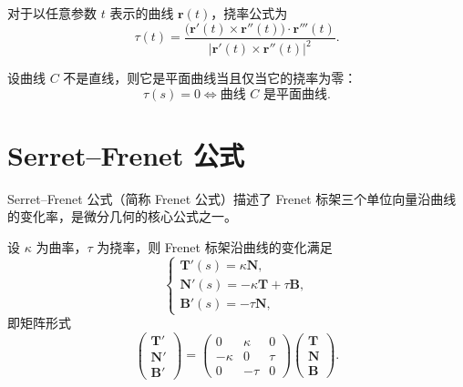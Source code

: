 \begin{proposition}[任意参数下的挠率公式]
	对于以任意参数 $t$ 表示的曲线 $\boldsymbol{r}(t)$，挠率公式为
	\begin{equation}
		\tau(t)=\frac{\bigl(\boldsymbol{r}'(t)\times\boldsymbol{r}''(t)\bigr)\cdot\boldsymbol{r}'''(t)}
		{\left|\boldsymbol{r}'(t)\times\boldsymbol{r}''(t)\right|^{2}}.
		\label{eq:挠率:任意参数公式}
	\end{equation}
\end{proposition}

\begin{theorem}[平面曲线的判定]
	设曲线 $C$ 不是直线，则它是平面曲线当且仅当它的挠率为零：
	\begin{equation}
		\tau(s)=0\iff \text{曲线 }C\text{ 是平面曲线}.
		\label{eq:挠率:平面曲线判定}
	\end{equation}
\end{theorem}

\section{Serret--Frenet 公式}

Serret--Frenet 公式（简称 Frenet 公式）描述了 Frenet 标架三个单位向量沿曲线的变化率，是微分几何的核心公式之一。

\begin{theorem}[Frenet 公式]
	设 $\kappa$ 为曲率，$\tau$ 为挠率，则 Frenet 标架沿曲线的变化满足
	\begin{equation}
		\begin{cases}
			\mathbf{T}'(s)=\kappa\mathbf{N},\\
			\mathbf{N}'(s)=-\kappa\mathbf{T}+\tau\mathbf{B},\\
			\mathbf{B}'(s)=-\tau\mathbf{N},
		\end{cases}
		\label{eq:Frenet公式:方程组}
	\end{equation}
	即矩阵形式
	\begin{equation}
		\begin{pmatrix}
			\mathbf{T}'\\
			\mathbf{N}'\\
			\mathbf{B}'
		\end{pmatrix}
		=
		\begin{pmatrix}
			0 & \kappa & 0\\
			-\kappa & 0 & \tau\\
			0 & -\tau & 0
		\end{pmatrix}
		\begin{pmatrix}
			\mathbf{T}\\
			\mathbf{N}\\
			\mathbf{B}
		\end{pmatrix}.
		\label{eq:Frenet公式:矩阵形式}
	\end{equation}
\end{theorem}


